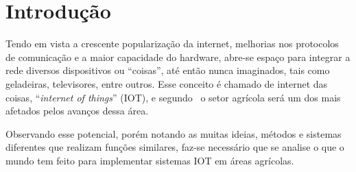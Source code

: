 \documentclass[
	article,			%
	12pt,				%
	oneside,			%
	a4paper,			%
	english,			%
	brazil,				%
	sumario=tradicional
	]{abntex2}
\begin{document}
\cleardoublepage


\textual
\section{Introdução}
Tendo em vista a crescente popularização da internet, melhorias nos protocolos de comunicação e a maior capacidade do hardware, abre-se espaço para integrar a rede diversos dispositivos ou ``coisas'', até então nunca imaginados, tais como geladeiras, televisores, entre outros. Esse conceito é chamado de internet das coisas, ``\textit{internet of things}'' (IOT), e segundo~\citeauthor{5} o setor agrícola será um dos mais afetados pelos avanços dessa área.

Observando esse potencial, porém notando as muitas ideias, métodos e sistemas diferentes que realizam funções similares, faz-se necessário que se analise o que o mundo tem feito para implementar sistemas IOT em áreas agrícolas.
\end{document}
